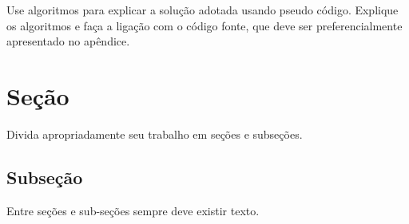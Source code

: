 \documentclass[a4paper,11pt,final]{article}
\begin{document}
\begin{table}[ht]
\centering
{}
\caption{Exemplo de tabela.}\label{tab:i}
\end{table}

Use algoritmos para explicar a solução adotada usando pseudo código. Explique os algoritmos e faça a ligação com o código fonte, que deve ser preferencialmente apresentado no apêndice.


\section{Seção}
Divida apropriadamente seu trabalho em seções e subseções.

\subsection{Subseção}
Entre seções e sub-seções sempre deve existir texto.
\end{document}
